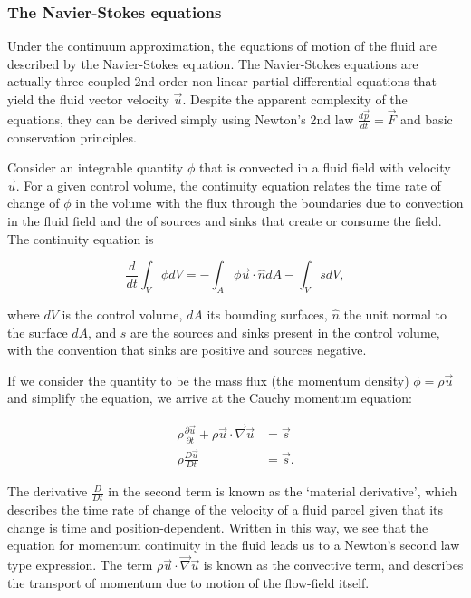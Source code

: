 			\subsubsection{The Navier-Stokes equations}
				Under the continuum approximation, the equations of motion of the fluid are described by the Navier-Stokes equation. The Navier-Stokes equations are actually three coupled 2nd order non-linear partial differential equations that yield the fluid vector velocity $\vec{u}$. Despite the apparent complexity of the equations, they can be derived simply using Newton's 2nd law $\frac{d\vec{p}}{dt}=\vec{F}$ and basic conservation principles.
				
				Consider an integrable quantity $\phi$ that is convected in a fluid field with velocity $\vec{u}$. For a given control volume, the continuity equation relates the time rate of change of $\phi$ in the volume with the flux through the boundaries due to convection in the fluid field and the of sources and sinks that create or consume the field. The continuity equation is 
				
				\[ \frac{d}{dt}\int_{V}\phi dV=-\int_{A}\phi\vec{u}\cdot\hat{n}dA-\int_{V}s dV, \]
				
				where $dV$ is the control volume, $dA$ its bounding surfaces, $\hat{n}$ the unit normal to the surface $dA$, and $s$ are the sources and sinks present in the control volume, with the convention that sinks are positive and sources negative.
				
				If we consider the quantity to be the mass flux (the momentum density) $\phi=\rho \vec{u}$ and simplify the equation, we arrive at the Cauchy momentum equation:
				
				\begin{equation}  \label{eq:cauchymomentum} \tag{Cauchy momentum equation}
					\begin{split}
						\rho\frac{\partial\vec{u}}{\partial t}+\rho\vec{u}\cdot\vec{\nabla}\vec{u} &= \vec{s} \\
						\rho\frac{D\vec{u}}{Dt} &= \vec{s}.
					\end{split}
				\end{equation}
				
				The derivative $\frac{D}{Dt}$ in the second term is known as the `material derivative', which describes the time rate of change of the velocity of a fluid parcel given that its change is time and position-dependent. Written in this way, we see that the equation for momentum continuity in the fluid leads us to a Newton's second law type expression. The term $\rho\vec{u}\cdot\vec{\nabla}\vec{u}$ is known as the convective term, and describes the transport of momentum due to motion of the flow-field itself.
				
